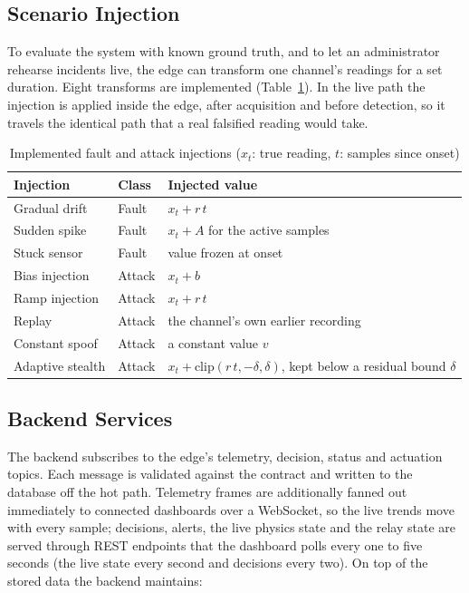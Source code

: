 \subsection{Scenario Injection}

To evaluate the system with known ground truth, and to let an administrator rehearse incidents live, the edge can transform one channel's readings for a set duration. Eight transforms are implemented (Table~\ref{tab:injections}). In the live path the injection is applied inside the edge, after acquisition and before detection, so it travels the identical path that a real falsified reading would take.

\begin{table}[htbp]
\centering
\caption{Implemented fault and attack injections ($x_t$: true reading, $t$: samples since onset)}
\label{tab:injections}
\small
\begin{tabularx}{\textwidth}{@{}l l X@{}}
\toprule
\textbf{Injection} & \textbf{Class} & \textbf{Injected value} \\
\midrule
Gradual drift & Fault & $x_t + r\,t$ \\
Sudden spike & Fault & $x_t + A$ for the active samples \\
Stuck sensor & Fault & value frozen at onset \\
Bias injection & Attack & $x_t + b$ \\
Ramp injection & Attack & $x_t + r\,t$ \\
Replay & Attack & the channel's own earlier recording \\
Constant spoof & Attack & a constant value $v$ \\
Adaptive stealth & Attack & $x_t + \mathrm{clip}(r\,t, -\delta, \delta)$, kept below a residual bound $\delta$ \\
\bottomrule
\end{tabularx}
\end{table}

\subsection{Backend Services}

The backend subscribes to the edge's telemetry, decision, status and actuation topics. Each message is validated against the contract and written to the database off the hot path. Telemetry frames are additionally fanned out immediately to connected dashboards over a WebSocket, so the live trends move with every sample; decisions, alerts, the live physics state and the relay state are served through REST endpoints that the dashboard polls every one to five seconds (the live state every second and decisions every two). On top of the stored data the backend maintains:

